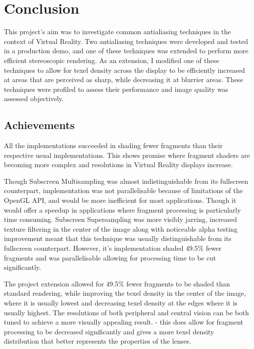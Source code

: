 \documentclass[12pt,a4paper,twoside,openright]{report}
\begin{document}
\chapter{Conclusion}

This project's aim was to investigate common antialiasing techniques in the context of Virtual Reality. Two antialiasing techniques were developed and tested in a production demo, and one of these techniques was extended to perform more efficient stereoscopic rendering. As an extension, I modified one of these techniques to allow for texel density across the display to be efficiently increased at areas that are perceived as sharp, while decreasing it at blurrier areas. These techniques were profiled to assess their performance and image quality was assessed objectively.  

\section{Achievements}

All the implementations succeeded in shading fewer fragments than their respective usual implementations.
This shows promise where fragment shaders are becoming more complex and resolutions in Virtual Reality displays increase. \par

Though Subscreen Multisampling was almost indistinguishable from its fullscreen counterpart, implementation was not parallelisable because of limitations of the OpenGL API, and would be more inefficient for most applications. Though it would offer a speedup in applications where fragment processing is particularly time consuming.
Subscreen Supersampling was more visibly jarring, increased texture filtering in the center of the image along with noticeable alpha testing improvement meant that this technique was usually distinguishable from its fullscreen counterpart.
However, it's implementation shaded 49.5\% fewer fragments and was parallelisable allowing for processing time to be cut significantly. \par

The project extension allowed for 49.5\% fewer fragments to be shaded than standard rendering, while improving the texel density in the center of the image, where it is usually lowest and decreasing texel density at the edges where it is usually highest. The resolutions of both peripheral and central vision can be both tuned to achieve a more visually appealing result. - this does allow for fragment processing to be decreased significantly and gives a more texel density distribution that better represents the properties of the lenses. \par
\end{document}
